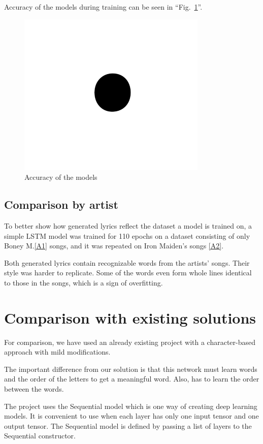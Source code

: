 \documentclass[conference]{IEEEtran}
\begin{document}
Accuracy of the models during training can be seen in ``Fig.~\ref{fig}''.

\begin{figure}[htbp]
\centerline{\includegraphics{fig1.png}}
\caption{Accuracy of the models}
\label{fig}
\end{figure}

\subsection{Comparison by artist}
To better show how generated lyrics reflect the dataset a model is trained on,
a simple LSTM model was trained for 110 epochs on a dataset consisting of only
Boney M.\ref{A1} songs, and it was repeated on Iron Maiden's songs \ref{A2}.

Both generated lyrics contain recognizable words from the artists' songs. Their
style was harder to replicate. Some of the words even form whole lines identical
to those in the songs, which is a sign of overfitting. 

\section{Comparison with existing solutions}
For comparison, we have used an already existing project with a character-based approach with mild modifications.

The important difference from our solution is that this network must learn words and the order of the letters to get a meaningful word.
Also, has to learn the order between the words.

The project uses the Sequential model which is one way of creating deep learning models. 
It is convenient to use when each layer has only one input tensor and one output
tensor. The Sequential model is defined by passing a list of layers to the Sequential
constructor.
\end{document}
